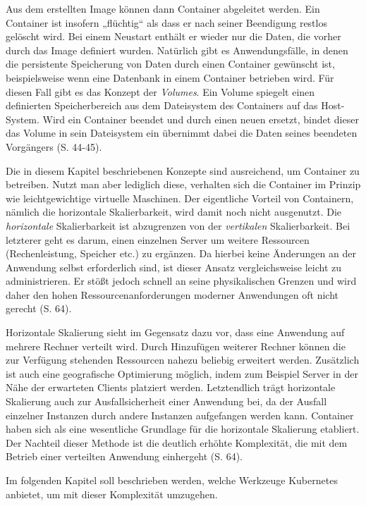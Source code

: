 \documentclass[11pt,a4paper]{article}
\begin{document}
Aus dem erstellten Image können dann Container abgeleitet werden. Ein Container ist insofern „flüchtig“ als dass er nach seiner
Beendigung restlos gelöscht wird. Bei einem Neustart enthält er wieder nur die Daten, die vorher durch das Image definiert wurden.
Natürlich gibt es Anwendungsfälle, in denen die persistente Speicherung von Daten durch einen Container gewünscht ist,
beispielsweise wenn
eine Datenbank in einem Container betrieben wird. Für diesen Fall gibt es das Konzept der \emph{Volumes}.
Ein Volume spiegelt einen definierten Speicherbereich aus dem Dateisystem des Containers auf das Host-System.
Wird ein Container beendet und durch einen neuen ersetzt, bindet dieser das Volume in sein Dateisystem ein übernimmt
dabei die Daten seines beendeten Vorgängers \cite{kofler2021docker} (S. 44-45).

Die in diesem Kapitel beschriebenen Konzepte sind ausreichend, um Container zu betreiben.
Nutzt man aber lediglich diese, verhalten sich die Container im Prinzip wie leichtgewichtige virtuelle Maschinen.
Der eigentliche Vorteil von Containern, nämlich die horizontale Skalierbarkeit, wird damit noch nicht ausgenutzt.
Die \emph{horizontale} Skalierbarkeit ist abzugrenzen von der \emph{vertikalen} Skalierbarkeit.
Bei letzterer geht es darum, einen einzelnen Server um weitere Ressourcen (Rechenleistung, Speicher etc.) zu ergänzen.
Da hierbei keine Änderungen an der Anwendung selbst erforderlich sind, ist dieser Ansatz vergleichsweise leicht
zu administrieren. Er stößt jedoch schnell an seine physikalischen Grenzen und wird daher den hohen
Ressourcenanforderungen moderner Anwendungen oft nicht gerecht \cite{Schmeling_Dargatz_2022} (S. 64).

Horizontale Skalierung sieht im Gegensatz dazu vor, dass eine Anwendung
auf mehrere Rechner verteilt wird. Durch Hinzufügen weiterer Rechner können die zur Verfügung stehenden Ressourcen nahezu beliebig erweitert werden.
Zusätzlich ist auch eine geografische Optimierung möglich, indem zum Beispiel Server in der Nähe der erwarteten Clients platziert werden.
Letztendlich trägt horizontale Skalierung auch zur Ausfallsicherheit einer Anwendung bei, da der Ausfall einzelner Instanzen durch andere Instanzen
aufgefangen werden kann.
Container haben sich als eine wesentliche Grundlage für die horizontale Skalierung etabliert.
Der Nachteil dieser Methode ist die deutlich erhöhte Komplexität,
die mit dem Betrieb einer verteilten Anwendung einhergeht \cite{Schmeling_Dargatz_2022} (S. 64).

Im folgenden Kapitel soll beschrieben werden, welche Werkzeuge Kubernetes anbietet, um mit dieser Komplexität umzugehen.
\end{document}
